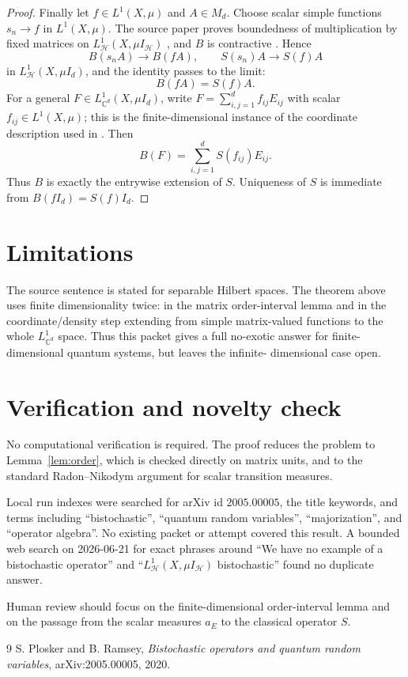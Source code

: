 \documentclass[11pt]{article}
\newcommand{\HH}{\mathcal H}
\begin{document}
\begin{proof}
Finally let \(f\in L^1(X,\mu)\) and \(A\in M_d\).  Choose scalar simple
functions \(s_n\to f\) in \(L^1(X,\mu)\).  The source paper proves boundedness
of multiplication by fixed matrices on \(L^1_{\HH}(X,\mu I_{\HH})\)
\cite[Proposition 4.4]{PR}, and \(B\) is contractive
\cite[Proposition 5.4]{PR}.  Hence
\[
        B(s_nA)\to B(fA),\qquad S(s_n)A\to S(f)A
\]
in \(L^1_{\HH}(X,\mu I_d)\), and the identity passes to the limit:
\[
        B(fA)=S(f)A.
\]
For a general \(F\in L^1_{\mathbb C^d}(X,\mu I_d)\), write
\(F=\sum_{i,j=1}^d f_{ij}E_{ij}\) with scalar \(f_{ij}\in L^1(X,\mu)\); this is
the finite-dimensional instance of the coordinate description used in
\cite[Theorem 5.5]{PR}.  Then
\[
        B(F)=\sum_{i,j=1}^d S(f_{ij})E_{ij}.
\]
Thus \(B\) is exactly the entrywise extension of \(S\).  Uniqueness of \(S\)
is immediate from \(B(fI_d)=S(f)I_d\).
\end{proof}

\section*{Limitations}

The source sentence is stated for separable Hilbert spaces.  The theorem above
uses finite dimensionality twice: in the matrix order-interval lemma and in the
coordinate/density step extending from simple matrix-valued functions to the
whole \(L^1_{\mathbb C^d}\) space.  Thus this packet gives a full no-exotic
answer for finite-dimensional quantum systems, but leaves the infinite-
dimensional case open.

\section*{Verification and novelty check}

No computational verification is required.  The proof reduces the problem to
Lemma~\ref{lem:order}, which is checked directly on matrix units, and to the
standard Radon--Nikodym argument for scalar transition measures.

Local run indexes were searched for arXiv id \(2005.00005\), the title
keywords, and terms including ``bistochastic'', ``quantum random variables'',
``majorization'', and ``operator algebra''.  No existing packet or attempt
covered this result.  A bounded web search on 2026-06-21 for exact phrases
around ``We have no example of a bistochastic operator'' and
``\(L^1_{\HH}(X,\mu I_{\HH})\) bistochastic'' found no duplicate answer.

Human review should focus on the finite-dimensional order-interval lemma and
on the passage from the scalar measures \(a_E\) to the classical operator
\(S\).

\begin{thebibliography}{9}
S. Plosker and B. Ramsey,
\emph{Bistochastic operators and quantum random variables},
arXiv:2005.00005, 2020.
\end{thebibliography}
\end{document}

